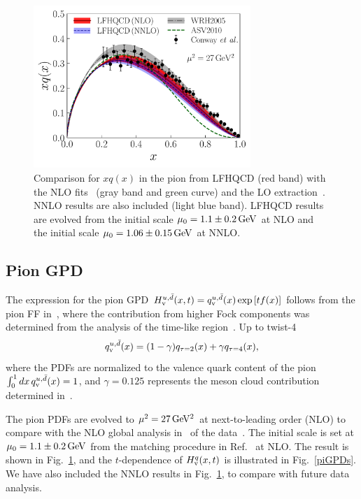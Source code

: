 \documentclass[aps,prl,reprint,groupedaddress, preprintnumbers]{revtex4-1}
\def\be{\begin{equation}}
\def\ee{\end{equation}}
\begin{document}
\begin{figure}[htbp] 
\begin{center} 
\includegraphics[width=8.2cm]{pion-xv.pdf}
\setlength\abovecaptionskip{-4pt}
\setlength\belowcaptionskip{-6pt}
\caption{\label{pionGPD} Comparison for $x q(x)$ in the pion from LFHQCD (red band) with the NLO fits~\cite{Wijesooriya:2005ir,Aicher:2010cb} (gray band and green curve) and the LO extraction~\cite{Conway:1989fs}. NNLO results are also included (light blue band). LFHQCD results are evolved from the initial scale $\mu_0 = 1.1 \pm 0.2 \,\rm GeV$ at NLO and the initial scale $\mu_0=1.06\pm0.15\,\rm GeV$ at NNLO.}
\end{center}
\end{figure}


\subsection{Pion GPD}

The expression for the pion GPD $H^{u, \bar d}_{\rm v}(x,t) = q_{\rm v}^{u, \bar d}(x) \exp \left[t f(x)\right]$ follows from the pion FF in~\cite{deTeramond:2010ez}, where the contribution from higher Fock components was determined from the analysis of the time-like region~\cite{deTeramond:2010ez}. Up to twist-4
\be
q^{u,\bar d}_{\rm v}(x) = (1 - \gamma) q_{\tau=2}(x) + \gamma q_{\tau=4}(x),\label{pionpdf}
\ee
where the PDFs are normalized to the valence quark content of the pion
$ 
\int_0^1 dx \, q^{u, \bar d}_{\rm v}(x) = 1
$,
and $\gamma = 0.125$ represents the meson cloud contribution  determined in~\cite{Brodsky:2014yha}.


The pion PDFs are evolved to $\mu^2=27\,\rm GeV^2$ at next-to-leading order (NLO) to compare with the NLO global analysis in~\cite{Wijesooriya:2005ir, Aicher:2010cb} of the data~\cite{Conway:1989fs}. The initial scale is set at $\mu_0 = 1.1 \pm 0.2 \,\rm GeV$ from the matching procedure in Ref.~\cite{Deur:2016opc} at NLO. The result is shown in Fig.~\ref{pionGPD}, and the $t$-dependence of  $H^{q}_{\rm v}(x,t)$ is illustrated in Fig.~\ref{piGPDs}. We have also included the NNLO results in Fig.~\ref{pionGPD}, to compare with future data analysis.
\end{document}
